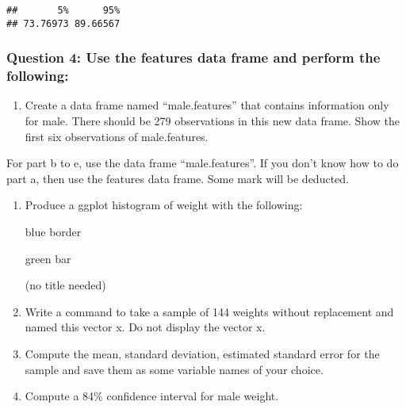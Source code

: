 \documentclass[
]{article}
\providecommand{\tightlist}{%
  \setlength{\itemsep}{0pt}\setlength{\parskip}{0pt}}
\begin{document}
\begin{verbatim}
##       5%      95% 
## 73.76973 89.66567
\end{verbatim}

\hypertarget{question-4-use-the-features-data-frame-and-perform-the-following}{%
\subsubsection{Question 4: Use the features data frame and perform the
following:}\label{question-4-use-the-features-data-frame-and-perform-the-following}}

\begin{enumerate}
\def\labelenumi{\alph{enumi}.}
\tightlist
\item
  Create a data frame named ``male.features'' that contains information
  only for male. There should be 279 observations in this new data
  frame. Show the first six observations of male.features.
\end{enumerate}

For part b to e, use the data frame ``male.features''. If you don't know
how to do part a, then use the features data frame. Some mark will be
deducted.

\begin{enumerate}
\def\labelenumi{\alph{enumi}.}
\setcounter{enumi}{1}
\item
  Produce a ggplot histogram of weight with the following:

  blue border

  green bar

  (no title needed)
\item
  Write a command to take a sample of 144 weights without replacement
  and named this vector x. Do not display the vector x.
\item
  Compute the mean, standard deviation, estimated standard error for the
  sample and save them as some variable names of your choice.
\item
  Compute a 84\% confidence interval for male weight.
\end{enumerate}
\end{document}
